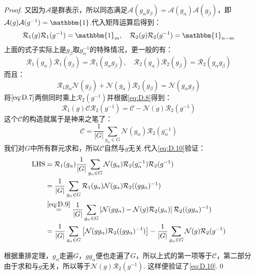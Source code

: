 \begin{proof}
    又因为$\mathscr{A}$是群表示，所以同态满足$\mathcal{A}(g_\alpha g_\beta)=\mathcal{A}(g_\alpha)\mathcal{A}(g_\beta)$，即$\mathcal{A}(g)\mathcal{A}(g^{-1})=\mathbbm{1}$.代入矩阵运算后得到：
    \begin{equation}
        \label{eq:D.8}
        \mathcal{R}_1(g)\mathcal{R}_1(g^{-1})=\mathbbm{1}_{m},\quad\mathcal{R}_2(g)\mathcal{R}_2(g^{-1})=\mathbbm{1}_{n-m}
    \end{equation}
    上面的式子实际上是$g_\beta$取$g_\alpha^{-1}$的特殊情况，更一般的有：
    \begin{equation*}
        \mathcal{R}_1(g_\alpha)\mathcal{R}_1(g_\beta)=\mathcal{R}_1(g_\alpha g_\beta),\quad \mathcal{R}_2(g_\alpha)\mathcal{R}_2(g_\beta)=\mathcal{R}_2(g_\alpha g_\beta)
    \end{equation*}
    而且：
    \begin{equation}
        \label{eq:D.9}
        \mathcal{R}_1{g_\alpha}\mathcal{N}(g_\beta)+\mathcal{N}(g_\alpha)\mathcal{R}_2(g_\beta)=\mathcal{N}(g_\alpha g_\beta)
    \end{equation}
    将$\ref{eq:D.7}$两侧同时乘上$\mathcal{R}_2(g^{-1})$并根据\ref{eq:D.8}得到：
    \begin{equation}
        \label{eq:D.10}
        \mathcal{R}_1(g)\mathcal{C}\mathcal{R}_2(g^{-1})=\mathcal{C}-\mathcal{N}(g)\mathcal{R}_2(g^{-1})
    \end{equation}
    这个$\mathcal{C}$的构造就属于是神来之笔了：
    \begin{equation}
        \mathcal{C}=\frac{1}{|G|}\sum_{g_\alpha\in G}\mathcal{N}(g_\alpha)\mathcal{R}_2(g_{\alpha}^{-1})        
    \end{equation}
    我们对$G$中所有群元求和，所以$\mathcal{C}$自然与$g$无关.代入\ref{eq:D.10}验证：
    \begin{align*}
        \mathrm{LHS}&=\mathcal{R}_1(g_\alpha)\frac{1}{|G|}\sum_{g_\alpha\in G}\mathcal{N}(g_\alpha)\mathcal{R}_2(g_{\alpha}^{-1})\mathcal{R}_2(g^{-1})\\
        &=\frac{1}{|G|}\sum_{g_\alpha\in G}\mathcal{R}_1(g_\alpha)\mathcal{N}(g_\alpha)\mathcal{R}_2((gg_{\alpha})^{-1})\\
        &\overset{\ref{eq:D.9}}{=}\frac{1}{|G|}\sum_{g_\alpha\in G}\left[\mathcal{N}(gg_\alpha)-\mathcal{N}(g)\mathcal{R}_2(g_\alpha)\right]\mathcal{R}_2((gg_\alpha)^{-1})\\
        &=\frac{1}{|G|}\sum_{g_\alpha\in G}\left[\mathcal{N}(gg_\alpha)\mathcal{R}_2((gg_\alpha)^{-1})\right]-\frac{1}{|G|}\sum_{g_\alpha\in G}\mathcal{N}(g)\mathcal{R}_2(g^{-1})
    \end{align*}
   
    根据重排定理，$g_\alpha$走遍$G$，$gg_\alpha$便也走遍了$G$，所以上式的第一项等于$\mathcal{C}$，第二部分由于求和与$g$无关，所以等于$\mathcal{N}(g)\mathcal{R}_2(g^{-1})$.
    这样便验证了\ref{eq:D.10}.\qed
\end{proof}    
